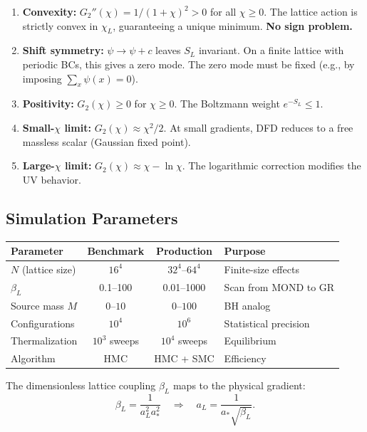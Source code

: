 \documentclass[11pt,a4paper]{article}
\begin{document}
\begin{enumerate}
\item \textbf{Convexity:} $G_2''(\chi) = 1/(1+\chi)^2 > 0$ for all $\chi \geq 0$. The lattice action is strictly convex in $\chi_L$, guaranteeing a unique minimum. \textbf{No sign problem.}

\item \textbf{Shift symmetry:} $\psi \to \psi + c$ leaves $S_L$ invariant. On a finite lattice with periodic BCs, this gives a zero mode. The zero mode must be fixed (e.g., by imposing $\sum_x \psi(x) = 0$).

\item \textbf{Positivity:} $G_2(\chi) \geq 0$ for $\chi \geq 0$. The Boltzmann weight $e^{-S_L} \leq 1$.

\item \textbf{Small-$\chi$ limit:} $G_2(\chi) \approx \chi^2/2$. At small gradients, DFD reduces to a free massless scalar (Gaussian fixed point).

\item \textbf{Large-$\chi$ limit:} $G_2(\chi) \approx \chi - \ln\chi$. The logarithmic correction modifies the UV behavior.
\end{enumerate}

\subsection{Simulation Parameters}

\begin{center}
\begin{tabular}{lccl}
\toprule
\textbf{Parameter} & \textbf{Benchmark} & \textbf{Production} & \textbf{Purpose} \\
\midrule
$N$ (lattice size) & $16^4$ & $32^4$--$64^4$ & Finite-size effects \\
$\beta_L$ & 0.1--100 & 0.01--1000 & Scan from MOND to GR \\
Source mass $M$ & $0$--$10$ & $0$--$100$ & BH analog \\
Configurations & $10^4$ & $10^6$ & Statistical precision \\
Thermalization & $10^3$ sweeps & $10^4$ sweeps & Equilibrium \\
Algorithm & HMC & HMC + SMC & Efficiency \\
\bottomrule
\end{tabular}
\end{center}

The dimensionless lattice coupling $\beta_L$ maps to the physical gradient:
\begin{equation}
\beta_L = \frac{1}{a_L^2 a_*^2} \quad \Rightarrow \quad a_L = \frac{1}{a_* \sqrt{\beta_L}}.
\end{equation}
\end{document}
